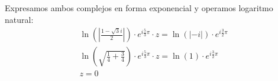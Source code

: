 \documentclass[12pt]{article}
\begin{document}
Expresamos ambos complejos en forma exponencial y operamos logaritmo natural:
\begin{align*}
  \ln\left(\left|\frac{1-\sqrt{3}i}{2}\right|\right)\cdot e^{i\frac{5}{3}\pi} \cdot z = \ln(|-i|) \cdot e^{i\frac{3}{2}\pi} \\
  \ln\left(\sqrt{\frac{1}{4} + \frac{3}{4}}\right)\cdot e^{i\frac{5}{3}\pi} \cdot z = \ln(1) \cdot e^{i\frac{3}{2}\pi}      \\
  \boxed{z = 0}                                                                                                             \\
\end{align*}
\end{document}

